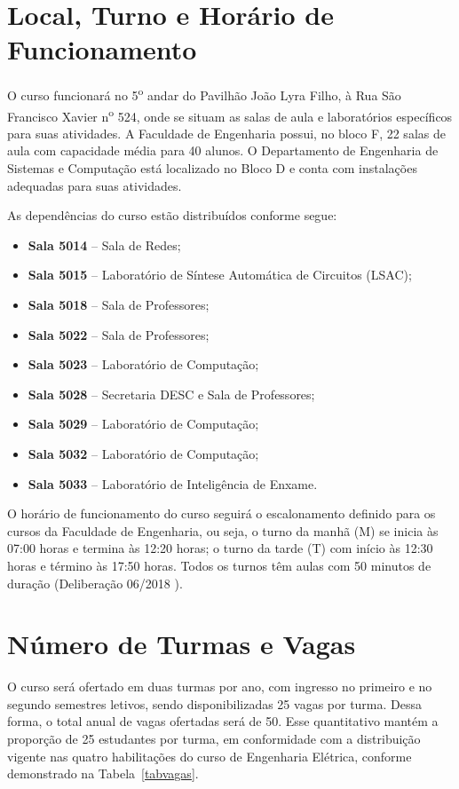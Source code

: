 \section{Local, Turno e Horário de Funcionamento}

O curso funcionará no 5\textsuperscript{o} andar do Pavilhão João Lyra Filho, à Rua São Francisco Xavier n\textsuperscript{o} 524, onde se situam as salas de aula e laboratórios específicos para suas atividades. A Faculdade de Engenharia possui, no bloco F, 22 salas de aula com capacidade média
para 40 alunos. O Departamento de Engenharia de Sistemas e Computação está localizado no Bloco D e conta com instalações adequadas para suas atividades.



As dependências do curso estão distribuídos conforme segue:
\begin{itemize}
    \item \textbf{Sala 5014} -- Sala de Redes;
    \item \textbf{Sala 5015} -- Laboratório de Síntese Automática de Circuitos (LSAC);
    \item \textbf{Sala 5018} -- Sala de Professores;
    \item \textbf{Sala 5022} -- Sala de Professores;
    \item \textbf{Sala 5023} -- Laboratório de Computação;
    \item \textbf{Sala 5028} -- Secretaria DESC e Sala de Professores;
    \item \textbf{Sala 5029} -- Laboratório de Computação;
    \item \textbf{Sala 5032} -- Laboratório de Computação;
    \item \textbf{Sala 5033} -- Laboratório de Inteligência de Enxame.
\end{itemize}


O horário de funcionamento do curso seguirá o escalonamento definido para os cursos da Faculdade de Engenharia, ou seja, o turno da manhã (M) se inicia às 07:00 horas e termina às 12:20 horas; o turno da tarde (T) com início às 12:30 horas e término às 17:50 horas. Todos os turnos têm aulas com 50 minutos de duração (Deliberação  06/2018 \cite{uerj2018}).

\section{Número de Turmas e Vagas}
O curso será ofertado em duas turmas por ano, com ingresso no primeiro e no segundo semestres letivos, sendo disponibilizadas 25 vagas por turma. Dessa forma, o total anual de vagas ofertadas será de 50. Esse quantitativo mantém a proporção de 25 estudantes por turma, em conformidade com a distribuição vigente nas quatro habilitações do curso de Engenharia Elétrica, conforme demonstrado na Tabela~\ref{tabvagas}.

